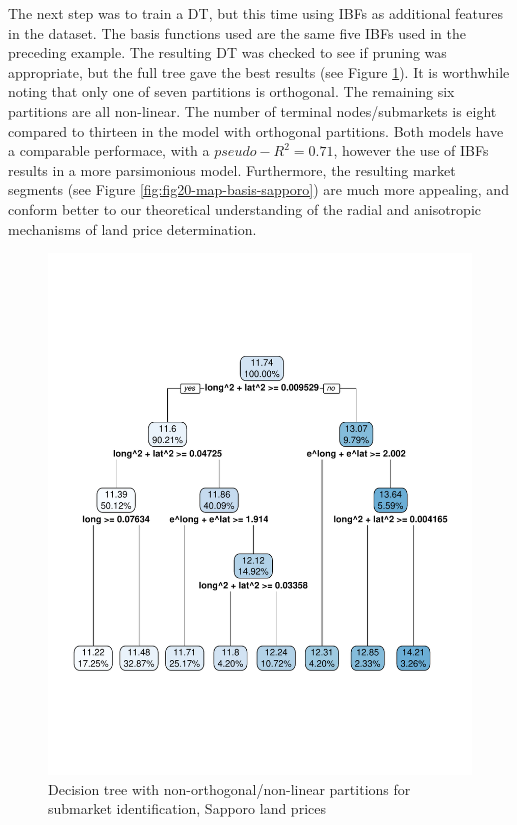 \documentclass[]{elsarticle} %
\makeatletter
\def\maxwidth{\ifdim\Gin@nat@width>\linewidth\linewidth
\else\Gin@nat@width\fi}
\let\Oldincludegraphics\includegraphics
\renewcommand{\includegraphics}[1]{\Oldincludegraphics[width=\maxwidth]{#1}}
\makeatother
\begin{document}
The next step was to train a DT, but this time using IBFs as additional
features in the dataset. The basis functions used are the same five IBFs
used in the preceding example. The resulting DT was checked to see if
pruning was appropriate, but the full tree gave the best results (see
Figure \ref{fig:fig19-tree-basis-sapporo}). It is worthwhile noting that
only one of seven partitions is orthogonal. The remaining six partitions
are all non-linear. The number of terminal nodes/submarkets is eight
compared to thirteen in the model with orthogonal partitions. Both
models have a comparable performace, with a \(pseudo-R^2=0.71\), however
the use of IBFs results in a more parsimonious model. Furthermore, the
resulting market segments (see Figure \ref{fig:fig20-map-basis-sapporo})
are much more appealing, and conform better to our theoretical
understanding of the radial and anisotropic mechanisms of land price
determination.

\begin{figure}[htbp]
\centering
\includegraphics{Trees_with_Base_Functions_files/figure-latex/fig19-tree-basis-sapporo-1.pdf}
\caption{\label{fig:fig19-tree-basis-sapporo}Decision tree with
non-orthogonal/non-linear partitions for submarket identification,
Sapporo land prices}
\end{figure}
\end{document}
